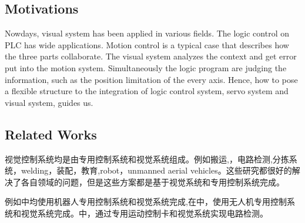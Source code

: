 \documentclass[journal,UTF8]{IEEEtran}
\begin{document}
\subsection{Motivations}
%
%
Nowdays, visual system has been applied in various fields. The logic control on PLC has wide applications. Motion control 
\cite{Chen2014A} is a typical case that describes how the three parts collaborate. The visual system analyzes the context and get error put into the motion system. Simultaneously the logic program are judging the information, such as the position limitation of the every axis. Hence, how to pose a flexible structure to the integration of logic control system, servo system and visual system, guides us.





\subsection{Related Works}

视觉控制系统均是由专用控制系统和视觉系统组成。例如搬运\cite{Xing2014Intersection},，电路检测\cite{Nian2005An},分拣系统，welding\cite{Chen2014A}，装配\cite{Wang2008Visual,Xiao2014Visual}，教育,robot\cite{Wu2013Cloud,Tsai2017A}，unmanned aerial vehicles\cite{Guenard2010A,Serra2016Landing}。这些研究都很好的解决了各自领域的问题，但是这些方案都是基于视觉系统和专用控制系统完成。

例如\cite{Wu2013Cloud,Tsai2017A}中均使用机器人专用控制系统和视觉系统完成,在\cite{Guenard2010A,Serra2016Landing}中，使用无人机专用控制系统和视觉系统完成。\cite{Nian2005An}中，通过专用运动控制卡和视觉系统实现电路检测。
\end{document}
